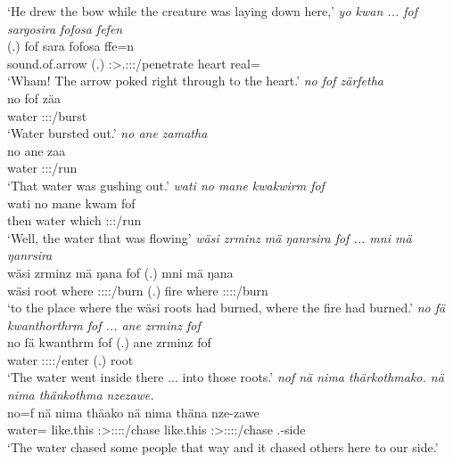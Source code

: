 \begin{exe}
	\trans `He drew the bow while the creature was laying down here,'
	\emph{yo kwan ... fof sargosira fofosa fefen}\\
	 (.) fof sara fofosa ffe=n\\ 
	sound.of.arrow (.) {\Emph} \Sg:\Sbj>\Tsg.\Masc:\Obj:\Pst:\Ipfv/penetrate heart real={\Loc}\\
	\trans `Wham! The arrow poked right through to the heart.'
	\emph{no fof zärfetha}\\
	\gll no fof zäa\\ 
	water {\Emph} \Sg:\Sbj:\Pst:\Pfv/burst\\
	\trans `Water bursted out.'
	\emph{no ane zamatha}\\
	\gll no ane zaa\\ 
	water {\Dem} \Sg:\Sbj:\Pst:\Pfv/run\\
	\trans `That water was gushing out.'
	\emph{wati no mane kwakwirm fof}\\
	\gll wati no mane kwam fof\\ 
	then water which \Sg:\Sbj:\Pst:\Dur/run {\Emph}\\
	\trans `Well, the water that was flowing'
	\emph{wäsi zrminz mä ŋanrsira fof ... mni mä ŋanrsira}\\
	\gll wäsi zrminz mä ŋana fof (.) mni mä ŋana\\ 
	wäsi root where \Sg:\Sbj:\Pst:\Ipfv:\Venit/burn {\Emph} (.) fire where \Sg:\Sbj:\Pst:\Ipfv:\Venit/burn\\
	\trans `to the place where the wäsi roots had burned, where the fire had burned.'
	\emph{no fä kwanthorthrm fof ... ane zrminz fof}\\
	\gll no fä kwanthrm fof (.) ane zrminz fof\\ 
	water {\Dist} \Sg:\Sbj:\Pst:\Dur:\Venit/enter {\Emph} (.) {\Dem} root {\Emph}\\
	\trans `The water went inside there ... into those roots.'
	\emph{nof nä nima thärkothmako. nä nima thänkothma nzezawe.}\\
	\gll no=f nä nima thäako nä nima thäna nze-zawe\\ 
	water={\Erg} {\Indf} like.this \Sg:\Sbj>\Stpl:\Obj:\Pst:\Pfv:\Andat/chase {\Indf} like.this \Sg:\Sbj>\Stpl:\Obj:\Pst:\Pfv:\Venit/chase \Fnsg.\Poss-side\\
	\trans `The water chased some people that way and it chased others here to our side.'

\end{exe}

